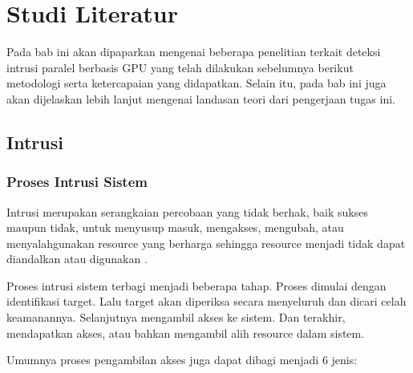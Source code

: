 \chapter{Studi Literatur}

Pada bab ini akan dipaparkan mengenai beberapa penelitian terkait deteksi intrusi paralel berbasis GPU yang telah dilakukan sebelumnya berikut metodologi serta ketercapaian yang didapatkan. Selain itu, pada bab ini juga akan dijelaskan lebih lanjut mengenai landasan teori dari pengerjaan tugas ini.

%

\section{Intrusi}


  \subsection{Proses Intrusi Sistem}

    Intrusi merupakan serangkaian percobaan yang tidak berhak, baik sukses maupun tidak, untuk menyusup masuk, mengakses, mengubah, atau menyalahgunakan resource yang berharga sehingga resource menjadi tidak dapat diandalkan atau digunakan \parencite{kizza2015}.

    Proses intrusi sistem terbagi menjadi beberapa tahap. Proses dimulai dengan identifikasi target. Lalu target akan diperiksa secara menyeluruh dan dicari celah keamanannya. Selanjutnya mengambil akses ke sistem. Dan terakhir, mendapatkan akses, atau bahkan mengambil alih resource dalam sistem. 

    Umumnya proses pengambilan akses juga dapat dibagi menjadi 6 jenis:

